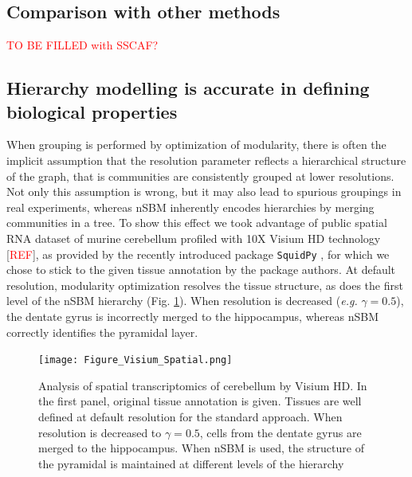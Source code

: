 \documentclass[10pt]{article}
\begin{document}

\subsection*{Comparison with other methods}

\textcolor{red}{TO BE FILLED with SSCAF?}


\subsection*{Hierarchy modelling is accurate in defining biological properties}

When grouping is performed by optimization of modularity, there is often the implicit assumption that the resolution parameter reflects a hierarchical structure of the graph, that is communities are consistently grouped at lower resolutions. Not only this assumption is wrong, but it may also lead to spurious groupings in real experiments, whereas nSBM inherently encodes hierarchies by merging communities in a tree. To show this effect we took advantage of public spatial RNA dataset of murine cerebellum profiled with 10X Visium HD technology [\textcolor{red}{REF}], as provided by the recently introduced package \texttt{SquidPy} \cite{Palla_Theis_2021}, for which we chose to stick to the given tissue annotation by the package authors. At default resolution, modularity optimization resolves the tissue structure, as does the first level of the nSBM hierarchy (Fig. \ref{Figure_Visium}). When resolution is decreased (\emph{e.g.} $\gamma = 0.5$), the dentate gyrus is incorrectly merged to the hippocampus, whereas nSBM correctly identifies the pyramidal layer.

\begin{figure}[H]
\centering
\texttt{[image: Figure\_Visium\_Spatial.png]}
\caption[]{Analysis of spatial transcriptomics of cerebellum by Visium HD. In the first panel, original tissue annotation is given. Tissues are well defined at default resolution for the standard approach. When resolution is decreased to $\gamma = 0.5$, cells from the dentate gyrus are merged to the hippocampus. When nSBM is used, the structure of the pyramidal is maintained at different levels of the hierarchy}\label{Figure_Visium}
\end{figure}
\end{document}
